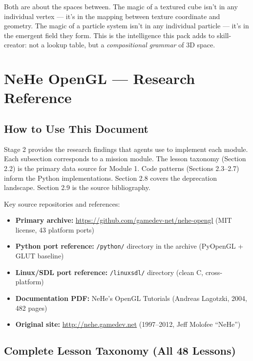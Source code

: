 \documentclass[11pt,letterpaper]{article}
\newcommand{\stageheader}[2]{%
  \noindent\colorbox{#2}{\makebox[\textwidth][l]{%
    \textcolor{white}{\bfseries\sffamily\hspace{6pt}#1\hspace{6pt}}}}%
  \vspace{0.5em}\par%
}
\begin{document}
Both are about the spaces between. The magic of a textured cube isn't in any individual vertex --- it's in the mapping between texture coordinate and geometry. The magic of a particle system isn't in any individual particle --- it's in the emergent field they form. This is the intelligence this pack adds to skill-creator: not a lookup table, but a \textit{compositional grammar} of 3D space.

\newpage

\stageheader{STAGE 2 --- RESEARCH REFERENCE}{secondary}

\section{NeHe OpenGL --- Research Reference}

\subsection{How to Use This Document}

Stage 2 provides the research findings that agents use to implement each module. Each subsection corresponds to a mission module. The lesson taxonomy (Section 2.2) is the primary data source for Module 1. Code patterns (Sections 2.3--2.7) inform the Python implementations. Section 2.8 covers the deprecation landscape. Section 2.9 is the source bibliography.

Key source repositories and references:
\begin{itemize}
\item \textbf{Primary archive:} \url{https://github.com/gamedev-net/nehe-opengl} (MIT license, 43 platform ports)
\item \textbf{Python port reference:} \texttt{/python/} directory in the archive (PyOpenGL + GLUT baseline)
\item \textbf{Linux/SDL port reference:} \texttt{/linuxsdl/} directory (clean C, cross-platform)
\item \textbf{Documentation PDF:} NeHe's OpenGL Tutorials (Andreas Lagotzki, 2004, 482 pages)
\item \textbf{Original site:} \url{http://nehe.gamedev.net} (1997--2012, Jeff Molofee ``NeHe'')
\end{itemize}

\subsection{Complete Lesson Taxonomy (All 48 Lessons)}
\end{document}
